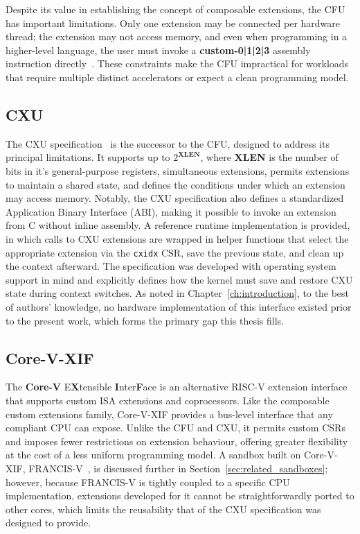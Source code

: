 Despite its value in establishing the concept of composable extensions, the CFU has
important limitations.
Only one extension may be connected per hardware thread; the extension may not access
memory, and even when programming in a higher-level language, the user must invoke a
\textbf{custom-0|1|2|3} assembly instruction directly~\cite{Gray2022CFU}.
These constraints make the CFU impractical for workloads that require multiple distinct
accelerators or expect a clean programming model.

\subsection{CXU}
\label{subsec:cxu}

The CXU specification~\cite{Gray2025CXU} is the successor to the CFU, designed to
address its principal limitations.
It supports up to $2^{\textbf{XLEN}}$,
where \textbf{XLEN} is the number of bits in it's general-purpose registers,
simultaneous extensions, permits extensions to
maintain a shared state, and defines the conditions under which an extension may access
memory.
Notably, the CXU specification also defines a standardized Application Binary Interface
(ABI), making it possible to invoke an extension from C without inline assembly.
A reference runtime implementation is provided, in which calls to CXU extensions are
wrapped in helper functions that select the appropriate extension via the
\texttt{cxidx} CSR,
 save the previous state, and clean up the context afterward.
The specification was developed with operating system support in mind and explicitly
defines how the kernel must save and restore CXU state during context switches.
As noted in Chapter~\ref{ch:introduction}, to the best of authors' knowledge, no hardware implementation of this interface existed prior to the present work, which forms the primary gap this thesis fills.

\subsection{Core-V-XIF}
\label{subsec:corev_xif}

The \textbf{Core-V} E\textbf{X}tensible \textbf{I}nter\textbf{F}ace
\cite{OpenHW2021XIF} is an alternative RISC-V extension interface that supports
custom ISA extensions and coprocessors.
Like the composable custom extensions family, Core-V-XIF provides a bus-level interface
that any compliant CPU can expose.
Unlike the CFU and CXU, it permits custom CSRs and imposes fewer restrictions on
extension behaviour, offering greater flexibility at the cost of a less uniform
programming model.
A sandbox built on Core-V-XIF, FRANCIS-V~\cite{Egert2023FRANCISV}, is discussed further
in Section~\ref{sec:related_sandboxes}; however, because FRANCIS-V is tightly coupled
to a specific CPU implementation, extensions developed for it cannot be straightforwardly
ported to other cores, which limits the reusability that of the CXU specification was
designed to provide.

